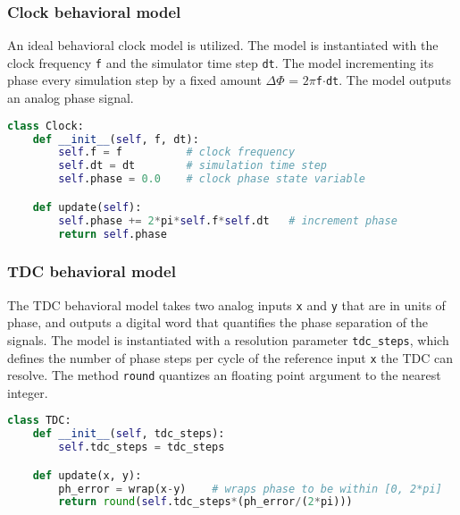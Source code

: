\subsubsection{Clock behavioral model}
An ideal behavioral clock model is utilized. The model is instantiated with the clock frequency \texttt{f} and the simulator time step \texttt{dt}. The model incrementing its phase every simulation step by a fixed amount $\Delta \Phi$ = $2\pi$\texttt{f}$\cdot$\texttt{dt}. The model outputs an analog phase signal.

\begin{lstlisting}[language={Python}, caption={Ideal clock behavioral model.}, label={clk_code}]
class Clock:
	def __init__(self, f, dt):
		self.f = f 			# clock frequency
		self.dt = dt 		# simulation time step
		self.phase = 0.0	# clock phase state variable

	def update(self):
		self.phase += 2*pi*self.f*self.dt 	# increment phase
		return self.phase
    \end{lstlisting}

\subsubsection{TDC behavioral model}
The TDC behavioral model takes two analog inputs \texttt{x} and \texttt{y} that are in units of phase, and outputs a digital word that quantifies the phase separation of the signals. The model is instantiated with a resolution parameter \texttt{tdc\_steps}, which defines the number of phase steps per cycle of the reference input \texttt{x} the TDC can resolve. The method \texttt{round} quantizes an floating point argument to the nearest integer.

\begin{lstlisting}[language={Python}, caption={TDC behavioral model.}, label={tdc_code}]
class TDC:
	def __init__(self, tdc_steps):
		self.tdc_steps = tdc_steps

	def update(x, y):
		ph_error = wrap(x-y) 	# wraps phase to be within [0, 2*pi]
		return round(self.tdc_steps*(ph_error/(2*pi)))
\end{lstlisting}
